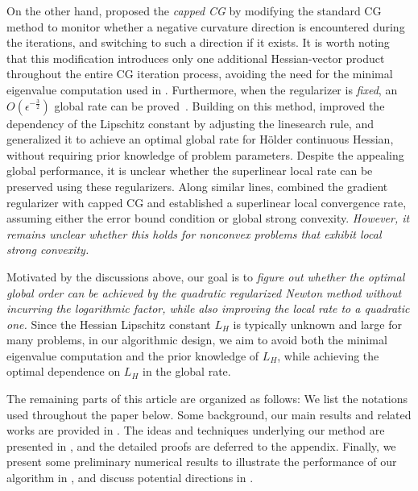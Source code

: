 On the other hand, \citet{royer2020newton} 
proposed the \emph{capped CG} by modifying the standard CG method to monitor whether a negative curvature direction is encountered during the iterations, 
and switching to such a direction if it exists.
It is worth noting that this modification introduces only one additional Hessian-vector product throughout the entire CG iteration process,
avoiding the need for the minimal eigenvalue computation used in \citet{gratton2024yet}.
Furthermore, when the regularizer is \emph{fixed}, 
an $O(\epsilon^{-\frac{3}{2}})$ global rate can be proved~\citep{royer2020newton}.
Building on this method, \citet{he2023newton-hessian,he2023newton} improved the dependency of the Lipschitz constant by adjusting the linesearch rule, 
and generalized it to achieve an optimal global rate for H\"older continuous Hessian, without requiring prior knowledge of problem parameters.
Despite the appealing global performance, it is unclear whether the superlinear local rate can be preserved using these regularizers.
Along similar lines, \citet{zhu2024hybrid} 
combined the gradient regularizer with capped CG and established a superlinear local convergence rate,
assuming either the error bound condition or global strong convexity. 
\emph{However, it remains unclear whether this holds for nonconvex problems that exhibit local strong convexity.} 

Motivated by the discussions above,
our goal is to \emph{figure out whether the optimal global order can be achieved by the quadratic regularized Newton method without incurring the logarithmic factor, 
while also improving the local rate to a quadratic one.}
Since the Hessian Lipschitz constant $L_H$ is typically unknown and large for many problems, in our algorithmic design, we aim to avoid both the minimal eigenvalue computation and the prior knowledge of $L_H$, while achieving the optimal dependence on $L_H$ in the global rate. %

The remaining parts of this article are organized as follows:
We list the notations used throughout the paper below.
Some background, our main results and related works are provided in .
The ideas and techniques underlying our method are presented in , 
and the detailed proofs are deferred to the appendix.
Finally, 
we present some preliminary numerical results to illustrate the performance of our algorithm in ,
and discuss potential directions in .

















